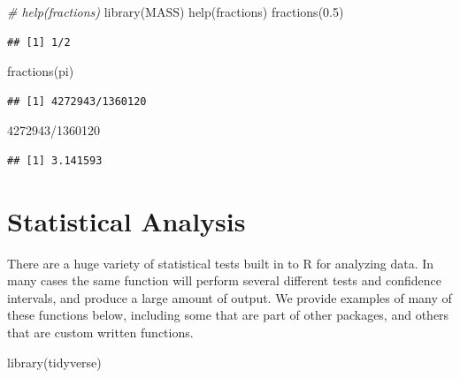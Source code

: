 \documentclass[
]{book}
\newenvironment{Shaded}{\begin{snugshade}}{\end{snugshade}}
\newcommand{\CommentTok}[1]{\textcolor[rgb]{0.56,0.35,0.01}{\textit{#1}}}
\newcommand{\DecValTok}[1]{\textcolor[rgb]{0.00,0.00,0.81}{#1}}
\newcommand{\FloatTok}[1]{\textcolor[rgb]{0.00,0.00,0.81}{#1}}
\newcommand{\FunctionTok}[1]{\textcolor[rgb]{0.00,0.00,0.00}{#1}}
\newcommand{\NormalTok}[1]{#1}
\newcommand{\SpecialCharTok}[1]{\textcolor[rgb]{0.00,0.00,0.00}{#1}}
\begin{document}
\begin{Shaded}
\begin{Highlighting}[]
\CommentTok{\# help(fractions)}
\FunctionTok{library}\NormalTok{(MASS)}
\FunctionTok{help}\NormalTok{(fractions)}
\FunctionTok{fractions}\NormalTok{(}\FloatTok{0.5}\NormalTok{)}
\end{Highlighting}
\end{Shaded}

\begin{verbatim}
## [1] 1/2
\end{verbatim}

\begin{Shaded}
\begin{Highlighting}[]
\FunctionTok{fractions}\NormalTok{(pi)}
\end{Highlighting}
\end{Shaded}

\begin{verbatim}
## [1] 4272943/1360120
\end{verbatim}

\begin{Shaded}
\begin{Highlighting}[]
\DecValTok{4272943}\SpecialCharTok{/}\DecValTok{1360120}
\end{Highlighting}
\end{Shaded}

\begin{verbatim}
## [1] 3.141593
\end{verbatim}

\hypertarget{statistical-analysis}{%
\chapter{Statistical Analysis}\label{statistical-analysis}}

There are a huge variety of statistical tests built in to R for analyzing data. In many cases the same function will perform several different tests and confidence intervals, and produce a large amount of output. We provide examples of many of these functions below, including some that are part of other packages, and others that are custom written functions.

\begin{Shaded}
\begin{Highlighting}[]
\FunctionTok{library}\NormalTok{(tidyverse)}
\end{Highlighting}
\end{Shaded}
\end{document}

